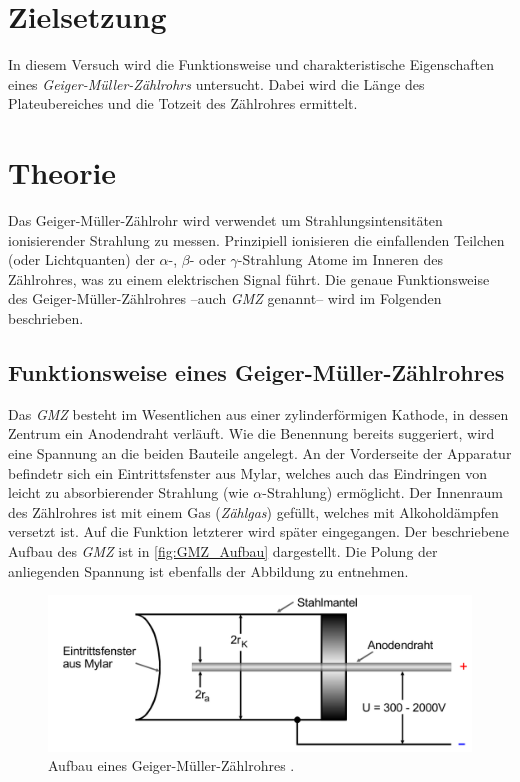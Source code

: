 \section{Zielsetzung}
\label{sec:Ziel}
In diesem Versuch wird die Funktionsweise und charakteristische Eigenschaften eines \textit{Geiger-Müller-Zählrohrs} untersucht. Dabei wird die Länge des Plateubereiches
und die Totzeit des Zählrohres ermittelt.

\section{Theorie}
\label{sec:Theorie}
Das Geiger-Müller-Zählrohr wird verwendet um Strahlungsintensitäten ionisierender Strahlung zu messen. Prinzipiell ionisieren die einfallenden Teilchen (oder Lichtquanten) der 
$\alpha$-, $\beta$- oder $\gamma$-Strahlung Atome im Inneren des Zählrohres, was zu einem elektrischen Signal führt. Die genaue Funktionsweise des Geiger-Müller-Zählrohres
--auch \textit{GMZ} genannt-- wird im Folgenden beschrieben.

\subsection{Funktionsweise eines Geiger-Müller-Zählrohres}
\label{subsec:Funktion_GMZ}
Das \textit{GMZ} besteht im Wesentlichen aus einer zylinderförmigen Kathode, in dessen Zentrum ein Anodendraht verläuft. Wie die Benennung bereits suggeriert, wird eine Spannung 
an die beiden Bauteile angelegt. An der Vorderseite der Apparatur befindetr sich ein Eintrittsfenster aus Mylar, welches auch das Eindringen von leicht zu absorbierender
Strahlung (wie $\alpha$-Strahlung) ermöglicht. Der Innenraum des Zählrohres ist mit einem Gas (\textit{Zählgas}) gefüllt, welches mit Alkoholdämpfen versetzt ist. Auf die Funktion
letzterer wird später eingegangen.
Der beschriebene Aufbau des \textit{GMZ} ist in \autoref{fig:GMZ_Aufbau} dargestellt. Die Polung der anliegenden Spannung ist ebenfalls der Abbildung zu entnehmen.

\begin{figure}
    \centering
    \includegraphics[width = .8\textwidth]{content/GMZ_Aufbau.png}
    \caption{Aufbau eines Geiger-Müller-Zählrohres \cite{v703}.}
    \label{fig:plot}
  \end{figure}

